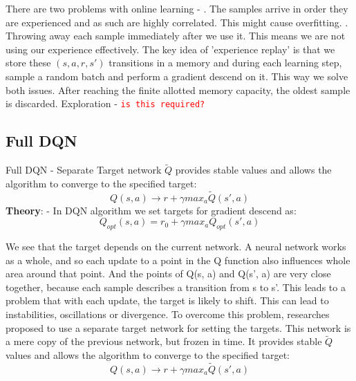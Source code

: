 \newline
There are two problems with online learning - . The samples arrive in order they are experienced and as such are highly correlated. This might cause overfitting.
. Throwing away each sample immediately after we use it. This means we are not using our experience effectively.
\newline
The key idea of 'experience replay' is that we store these $(s, a, r, s')$ transitions in a memory and during each learning step, sample a random batch and perform a gradient descend on it. This way we solve both issues.
After reaching the finite allotted memory capacity, the oldest sample is discarded.
 Exploration - \textcolor{red}{\texttt{is this required?}}\newline\newline

\subsection{Full DQN}
 Full DQN - Separate Target network $\tilde{Q}$ provides stable values and allows the algorithm to converge to the specified target:
\begin{equation}
Q(s,a) \rightarrow r + \gamma max_{a} \tilde{Q}(s', a)
\end{equation}
\textbf{Theory}: - In DQN algorithm we set targets for gradient descend as:
\begin{equation}
Q_{opt}(s,a) = r_{0} + \gamma max_{a}Q_{opt}(s',a)
\end{equation}

We see that the target depends on the current network. A neural network works as a whole, and so each update to a point in the Q function also influences whole area around that point. And the points of Q(s, a) and Q(s’, a) are very close together, because each sample describes a transition from s to s’. This leads to a problem that with each update, the target is likely to shift. This can lead to instabilities, oscillations or divergence.
\newline
To overcome this problem, researches proposed to use a separate target network for setting the targets. This network is a mere copy of the previous network, but frozen in time. It provides stable $\tilde{Q}$ values and allows the algorithm to converge to the specified target:
\begin{equation}
Q(s, a) \xrightarrow{} r + \gamma max_a \tilde{Q}(s', a)
\end{equation}

